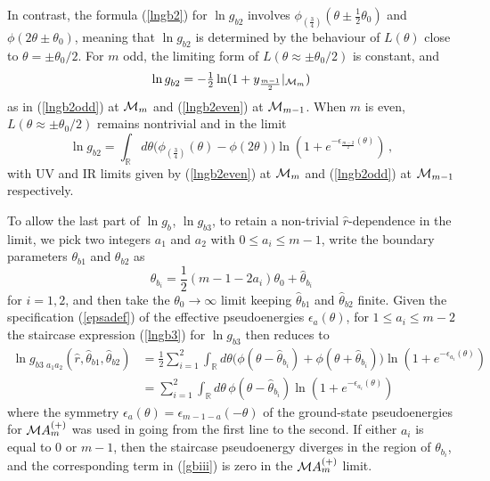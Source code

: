 \documentclass[11pt]{article}
\newcommand{\ep}{\epsilon}
\newcommand\RR{{\mathbb R}}
\newcommand\phup{^{\phantom o}}
\newcommand{\CM}{{\cal M}}
\newcommand\beq{\begin{equation}}
\newcommand\eeq{\end{equation}}
\newcommand\nn{\nonumber}
\newcommand\half{{\textstyle\frac{1}{2}}}
\newcommand{\te}{\theta}
\newcommand{\tbi}{\theta_{b1}}
\newcommand{\tbii}{\theta_{b2}}
\newcommand{\htbi}{\hat\theta_{b1}}
\newcommand{\htbii}{\hat\theta_{b2}}
\newcommand{\tz}{\theta_0}
\newcommand{\gb}{g\phup_b}
\newcommand{\gii}{g\phup_{b2}}
\newcommand{\giii}{g\phup_{b3}}
\begin{document}
In contrast, the formula 
(\ref{lngb2}) for $\ln\gii$ involves
$\phi_{(\frac{3}{4})}(\te\pm\half\tz)$ 
and $\phi(2\theta\pm\tz)$,
meaning that $\ln\gii$ is determined by
the behaviour of 
$L(\te)$ close to $\te=\pm\tz/2$.  For $m$ odd, the limiting 
form of $L(\theta\approx\pm\tz/2)$ is constant, and
\beq
\ln\gii=-\half\ln(1+y_{\frac{m-1}{2}}|_{\CM_{m}})
\eeq
as in (\ref{lngb2odd}) at $\CM_m$ and (\ref{lngb2even}) at $\CM_{m-1}$.
When $m$ is even, $L(\theta\approx\pm\tz/2)$ 
remains nontrivial and in the limit
\beq
\ln\gii=\int_{\RR}{d\te\bigl(\phi_{(\frac{3}{4})}(\te) -
\phi(2\theta)\bigr)\!\ln(1+e^{-\epsilon_{\frac{m-2}{2}}(\te)})}\,,
\eeq
with UV and IR limits given by (\ref{lngb2even}) at $\CM_m$
and (\ref{lngb2odd}) at $\CM_{m-1}$ respectively.

To allow the last part of $\ln\gb$, $\ln\giii$, 
to retain a non-trivial $\hat r$-dependence in
the limit, we pick two integers $a_1$ and $a_2$ with 
$0\le a_i\le m{-}1$, 
write the boundary parameters $\tbi$ and $\tbii$ 
as
\beq
\theta_{b_i}=\half(m{-}1{-}2a_i)\tz +\hat\theta_{b_i}
\eeq
for $i=1,2$, and then
take the $\tz\to\infty$ limit
keeping $\hat\theta_{b1}$ 
and $\hat\theta_{b2}$ finite.
Given the specification (\ref{epsadef}) of the effective
pseudoenergies $\ep_a(\theta)$, 
for $1\le a_i\le m{-}2$
the staircase expression
(\ref{lngb3}) for $\ln\giii$ then reduces to
\begin{align}
\ln g\phup_{b3\,\,a_1a_2}(\hat r,\htbi,\htbii) &=
\half\sum_{i=1}^2\int_{\RR}{d\te\bigl(\phi(\te-\hat\te_{b_i})+
\phi(\te+\hat\te_{b_i})
\bigr)\!\ln(1+e^{-\ep_{a_i}(\te)})} \nn\\
&=
\sum_{i=1}^2\int_{\RR}{d\te\,\phi(\te-\hat\te_{b_i})
\ln(1+e^{-\ep_{a_i}(\te)})}
\label{gbiii}
\end{align}
where the symmetry $\epsilon_a(\te)=\epsilon_{m-1-a}(-\te)$ 
of the ground-state pseudoenergies for $\CM A^{(+)}_m$
was used in going from the first line to the second.
If either $a_i$ is equal to $0$ or $m{-}1$, then the
staircase pseudoenergy diverges in the region of $\te_{b_i}$, and the
corresponding term in (\ref{gbiii}) is zero in the $\CM A^{(+)}_m$
limit.
\end{document}
